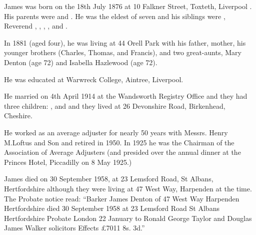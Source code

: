 
James was born on the 18th July 1876 at 10 Falkner Street, Toxteth, Liverpool \cite{JamesDBarkerBirth}. His parents were  and . He was the eldest of seven and his siblings were , Reverend , , , , and .

In 1881 (aged four), he was living at 44 Orell Park with his father, mother, his younger brothers (Charles, Thomas, and Francis), and two great-aunts, Mary Denton (age 72) and Isabella Hazlewood (age 72).\cite{UKCensusRG11_3688}

He was educated at Warwreck College, Aintree, Liverpool.

He married  on 4th April 1914 at the Wandsworth Registry Office \cite{JamesDBarkerMarriage} and they had three children: ,  and  and they lived at 26 Devonshire Road, Birkenhead, Cheshire.

He worked as an average adjuster for nearly 50 years with Messrs. Henry M.Loftus and Son and retired in 1950. In 1925 he was the Chairman of the Association of Average Adjusters (and presided over the annual dinner at the Princes Hotel, Piccadilly on 8 May 1925.)

James died on 30 September 1958, at 23 Lemsford Road, St Albans, Hertfordshire \cite{JamesDBarkerDeath} although they were living at 47 West Way, Harpenden at the time. The Probate notice read: ``Barker James Denton of 47 West Way Harpenden Hertfordshire died 30 September 1958 at 23 Lemsford Road St Albans Hertfordshire Probate London 22 January to Ronald George Taylor and Douglas James Walker solicitors Effects £7011 8s. 3d.''
